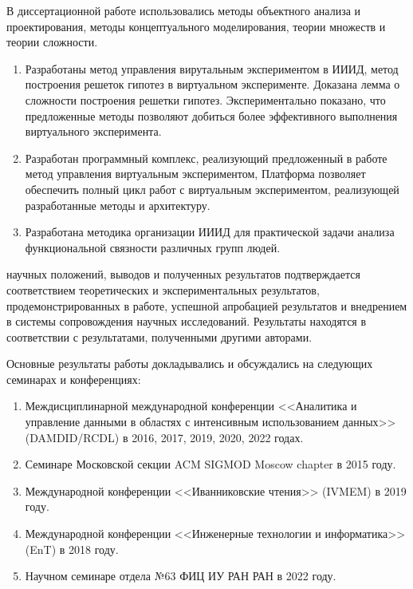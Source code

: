 {\methods} В диссертационной работе использовались методы объектного анализа и проектирования, методы
концептуального моделирования, теории множеств и теории сложности.

{}
\begin{enumerate}[beginpenalty=10000] %
  \item Разработаны метод управления вирутальным экспериментом в ИИИД, метод построения решеток гипотез в виртуальном 
        эксперименте. Доказана лемма о сложности построения решетки гипотез.  Экспериментально показано, что 
        предложенные методы позволяют добиться более эффективного выполнения виртуального эксперимента.
  \item Разработан программный комплекс, реализующий предложенный в работе метод управления виртуальным экспериментом,
        Платформа позволяет обеспечить полный цикл работ с виртуальным экспериментом, 
        реализующей разработанные методы и архитектуру.
  \item Разработана методика организации ИИИД для практической задачи анализа функциональной связности различных
        групп людей.

\end{enumerate}

{\reliability} 
научных положений, выводов и полученных результатов подтверждается соответствием
теоретических и экспериментальных результатов, продемонстрированных в работе, успешной апробацией результатов и 
внедрением в системы сопровождения научных исследований. 
Результаты находятся в соответствии с результатами, полученными другими авторами.


{\probation}
Основные результаты работы докладывались и обсуждались на следующих семинарах и конференциях:
\begin{enumerate}
    \item Междисциплинарной международной конференции <<Аналитика и управление данными в областях с интенсивным 
    использованием данных>> (DAMDID/RCDL) в 2016, 2017, 2019, 2020, 2022 годах.
    \item Семинаре Московской секции ACM SIGMOD Moscow chapter в 2015 году.
    \item Международной конференции <<Иванниковские чтения>> (IVMEM) в 2019 году.
    \item Международной конференции <<Инженерные технологии и информатика>> (EnT) в 2018 году.	
    \item Научном семинаре отдела №63 ФИЦ ИУ РАН РАН в 2022 году.

\end{enumerate}

